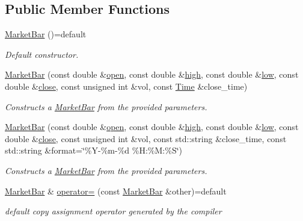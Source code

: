 \subsection*{Public Member Functions}
\begin{DoxyCompactItemize}
\item 
\hyperlink{classMarketBar_a547a73fdfc07436f859da36efb4d8809}{Market\+Bar} ()=default
\begin{DoxyCompactList}\small\item\em Default constructor. \end{DoxyCompactList}\item 
\hyperlink{classMarketBar_ad58b9bb40288a36f1cb9839ce120ea30}{Market\+Bar} (const double \&\hyperlink{classMarketBar_a2d0ebff20fd2d65f1b85da9ce7f5a836}{open}, const double \&\hyperlink{classMarketBar_a77bb9fef6fe9ba65f1b0c7cc0e94a6b7}{high}, const double \&\hyperlink{classMarketBar_aa1d4769489e2ce450d7e376fdfcb6ef4}{low}, const double \&\hyperlink{classMarketBar_a74369b5be9dd83b2410e2bc3e50b8437}{close}, const unsigned int \&vol, const \hyperlink{classMarketBar_a0d7dabe1fd00e674ef72f54bb1ff9ad0}{Time} \&close\+\_\+time)
\begin{DoxyCompactList}\small\item\em Constructs a \hyperlink{classMarketBar}{Market\+Bar} from the provided parameters. \end{DoxyCompactList}\item 
\hyperlink{classMarketBar_a50833d5593d6a3a42f9b5f30772dcafc}{Market\+Bar} (const double \&\hyperlink{classMarketBar_a2d0ebff20fd2d65f1b85da9ce7f5a836}{open}, const double \&\hyperlink{classMarketBar_a77bb9fef6fe9ba65f1b0c7cc0e94a6b7}{high}, const double \&\hyperlink{classMarketBar_aa1d4769489e2ce450d7e376fdfcb6ef4}{low}, const double \&\hyperlink{classMarketBar_a74369b5be9dd83b2410e2bc3e50b8437}{close}, const unsigned int \&vol, const std\+::string \&close\+\_\+time, const std\+::string \&format=\char`\"{}\%Y-\/\%m-\/\%d \%H\+:\%M\+:\%S\char`\"{})
\begin{DoxyCompactList}\small\item\em Constructs a \hyperlink{classMarketBar}{Market\+Bar} from the provided parameters. \end{DoxyCompactList}\item 
\hyperlink{classMarketBar}{Market\+Bar} \& \hyperlink{classMarketBar_aa0a4209809deddf5fb61272d405b1ddc}{operator=} (const \hyperlink{classMarketBar}{Market\+Bar} \&other)=default
\begin{DoxyCompactList}\small\item\em default copy assignment operator generated by the compiler \end{DoxyCompactList}\item 

\end{DoxyCompactItemize}
